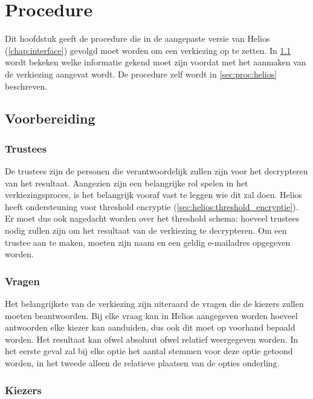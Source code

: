 % 
%

\chapter{Procedure}
\label{chap:procedure}

Dit hoofdstuk geeft de procedure die in de aangepaste versie van Helios (\ref{chap:interface}) gevolgd moet worden om een verkiezing op te zetten. In \ref{sec:proc:voorbereiding} wordt bekeken welke informatie gekend moet zijn voordat met het aanmaken van de verkiezing aangevat wordt. De procedure zelf wordt in \ref{sec:proc:helios} beschreven.

\section{Voorbereiding}
\label{sec:proc:voorbereiding}

\subsection{Trustees}

De trustees zijn de personen die verantwoordelijk zullen zijn voor het decrypteren van het resultaat. Aangezien zijn een belangrijke rol spelen in het verkiezingsproces, is het belangrijk vooraf vast te leggen wie dit zal doen. Helios heeft ondersteuning voor threshold encryptie (\ref{sec:helios:threshold_encryptie}). Er moet dus ook nagedacht worden over het threshold schema: hoeveel trustees nodig zullen zijn om het resultaat van de verkiezing te decrypteren. Om een trustee aan te maken, moeten zijn naam en een geldig e-mailadres opgegeven worden.

\subsection{Vragen}
\label{sec:proc:voorbereiding:vragen}

Het belangrijkste van de verkiezing zijn uiteraard de vragen die de kiezers zullen moeten beantwoorden. Bij elke vraag kan in Helios aangegeven worden hoeveel antwoorden elke kiezer kan aanduiden, dus ook dit moet op voorhand bepaald worden. Het resultaat kan ofwel absoluut ofwel relatief weergegeven worden. In het eerste geval zal bij elke optie het aantal stemmen voor deze optie getoond worden, in het tweede alleen de relatieve plaatsen van de opties onderling.

\subsection{Kiezers}
\label{sec:proc:voorbereiding:kiezers}

